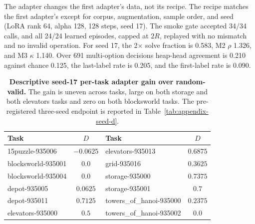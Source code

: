 The adapter changes the first adapter's data, not its recipe. The recipe matches the first adapter's except for corpus, augmentation, sample order, and seed (LoRA rank 64, alpha 128, 128 steps, seed 17). The smoke gate accepted 34/34 calls, and all 24/24 learned episodes, capped at $2R$, replayed with no mismatch and no invalid operation. For seed 17, the 2$\times$ solve fraction is 0.583, M2 $\rho$ 1.326, and M3 $\kappa$ 1.140. Over 691 multi-option decisions heap-head agreement is 0.210 against chance 0.125, the last-label rate is 0.205, and the first-label rate is 0.090.

\begin{table}[t]
\caption{\textbf{Descriptive seed-17 per-task adapter gain over random-valid.} The gain is uneven across tasks, large on both storage and both elevators tasks and zero on both blocksworld tasks. The pre-registered three-seed endpoint is reported in Table~\ref{tab:appendix-seed-d}.}
\label{tab:appendix-adapter-tasks}
\centering\footnotesize
\setlength{\tabcolsep}{3pt}
\begin{tabular}{@{}lc|lc@{}}
\toprule[0.4mm]
\rowcolor{mygray}\textbf{Task} & \textbf{$D$} & \textbf{Task} & \textbf{$D$} \\
\midrule
15puzzle-935006 & $-0.0625$ & elevators-935013 & $0.6875$ \\
blocksworld-935001 & $0.0$ & grid-935016 & $0.3625$ \\
blocksworld-935004 & $0.0$ & storage-935000 & $0.7375$ \\
depot-935005 & $0.0625$ & storage-935001 & $0.7$ \\
depot-935011 & $0.7125$ & towers\_of\_hanoi-935000 & $0.2375$ \\
elevators-935000 & $0.5$ & towers\_of\_hanoi-935002 & $0.0$ \\
\bottomrule
\end{tabular}
\end{table}

